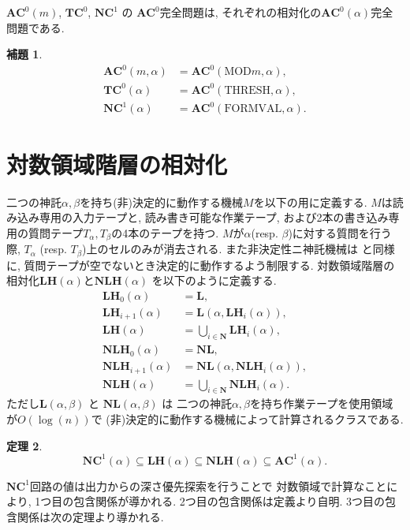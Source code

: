 \documentclass[11pt,a4paper]{jsarticle}
\theoremstyle{definition}
\newtheorem{theorem}{定理}%
\newtheorem{lemma}[theorem]{補題}
\theoremstyle{remark}
\newcommand{\N}{\mathbf N}
\newcommand{\classfont}{\mathbf}
\newcommand{\AC}{\classfont{AC}}
\newcommand{\TC}{\classfont{TC}}
\newcommand{\NC}{\classfont{NC}}
\renewcommand{\L}{\classfont{L}}
\newcommand{\NL}{\classfont{NL}}
\newcommand{\LH}{\classfont{LH}}
\newcommand{\NLH}{\classfont{NLH}}
\newcommand{\probfont}{\text}
\newcommand{\MOD}{\probfont{MOD}}
\newcommand{\THRESH}{\probfont{THRESH}}
\newcommand{\FORMVAL}{\probfont{FORMVAL}}
\begin{document}
$\AC^0(m)$, $\TC^0$, $\NC^1$ の $\AC^0$完全問題は, 
それぞれの相対化の$\AC^0(\alpha)$完全問題である.
\begin{lemma}
\begin{align*}
 \AC^0(m, \alpha) &= \AC^0(\MOD m, \alpha),
 \\
 \TC^0(\alpha) &= \AC^0(\THRESH, \alpha),
 \\
 \NC^1(\alpha) &= \AC^0(\FORMVAL, \alpha).
\end{align*} 
\end{lemma}


\section{対数領域階層の相対化}
\label{subsection: two query tapes}
\newcommand{\qqueryalpha}{q_{\text{query}}^\alpha}
\newcommand{\qquerybeta}{q_{\text{query}}^\beta}
\newcommand{\qyes}{q_{\text{yes}}}
\newcommand{\qno}{q_{\text{no}}}
\newcommand{\qacc}{q_{\text{accept}}}


二つの神託$\alpha, \beta$を持ち(非)決定的に動作する機械$M$を以下の用に定義する.
$M$は読み込み専用の入力テープと, 読み書き可能な作業テープ, 
および2本の書き込み専用の質問テープ$T_\alpha, T_\beta$の4本のテープを持つ.
$M$が$\alpha$(resp. $\beta$)に対する質問を行う際, 
$T_\alpha$ (resp. $T_\beta$)上のセルのみが消去される.
また非決定性ニ神託機械は \cite{ruzzo1984space} と同様に,
質問テープが空でないとき決定的に動作するよう制限する.
対数領域階層の相対化$\LH(\alpha)$と$\NLH(\alpha)$
を以下のように定義する.
\begin{align*}
 \LH_0(\alpha) &= \L,
\\
 \LH_{i+1}(\alpha) &= \L(\alpha, \LH_i(\alpha)), 
\\
 \LH(\alpha) &= \bigcup_{i \in \N} \LH_i(\alpha),
\\
 \NLH_0(\alpha) &= \NL,
\\
 \NLH_{i+1}(\alpha) &= \NL(\alpha, \NLH_i(\alpha)), 
\\
 \NLH(\alpha) &= \bigcup_{i \in \N} \NLH_i(\alpha).
\end{align*}
ただし$\L(\alpha, \beta)$ と $\NL(\alpha, \beta)$ は
二つの神託$\alpha, \beta$を持ち作業テープを使用領域が$O(\log(n))$で
(非)決定的に動作する機械によって計算されるクラスである.

\begin{theorem}
\begin{equation*}
 \NC^1(\alpha) 
 \subseteq \LH(\alpha)
 \subseteq \NLH(\alpha)
 \subseteq \AC^1(\alpha).
\end{equation*}
\end{theorem}
$\NC^1$回路の値は出力からの深さ優先探索を行うことで
対数領域で計算なことにより, 1つ目の包含関係が導かれる.
2つ目の包含関係は定義より自明.
3つ目の包含関係は次の定理より導かれる.
\end{document}
